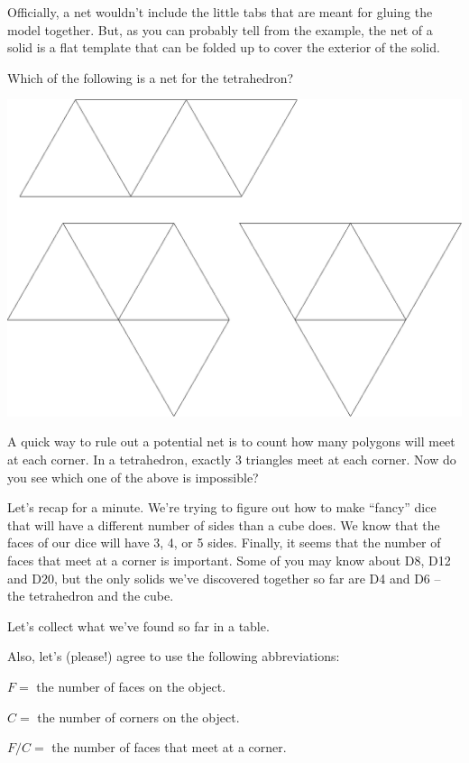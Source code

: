 Officially, a net wouldn't include the little tabs that are meant for gluing the model together. But, as you can probably tell from the example, the net of a solid is a flat template that can be folded up to cover the exterior of the solid.

Which of the following is a net for the tetrahedron?
\bigskip

\centerline{\includegraphics[scale=.25]{images/tetrahedron_nets.png}}
\bigskip

A quick way to rule out a potential net is to count how many polygons will meet at each corner.  In a tetrahedron, exactly $3$ triangles meet at each corner. Now do you see which one of the above is impossible?

\wbvfill

Let's recap for a minute.  We're trying to figure out how to make ``fancy'' dice that will have a different number of sides than a cube does.  We know that the faces of our dice will have 3, 4, or 5 sides.  Finally, it seems that the number of faces that meet at a corner is important.  Some of you may know about D8, D12 and D20, but the only solids we've discovered together so far are D4 and D6 -- the tetrahedron and the cube.

Let's collect what we've found so far in a table.

Also, let's (please!) agree to use the following abbreviations:

$F =$ the number of faces on the object.

$C =$ the number of corners on the object.

$F/C =$ the number of faces that meet at a corner.

